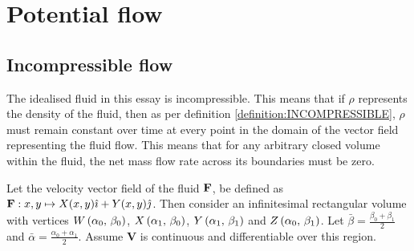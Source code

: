 \section{Potential flow}
\subsection{Incompressible flow}
The idealised fluid in this essay is incompressible. This means that if $\rho$ represents the density of the fluid, then as per definition \ref{definition:INCOMPRESSIBLE}, $\rho$ must 
remain constant over time at every point in the domain of the vector field representing the fluid flow. This means that for any arbitrary closed volume within the fluid, the net mass
flow rate across its boundaries must be zero.

Let the velocity vector field of the fluid $\mathbf{\mathbf{F}}$, be defined as $\mathbf{F}:x,y\mapsto X(x,y)\hat{\imath}+Y(x,y)\hat{\jmath}$. Then consider an infinitesimal rectangular volume with vertices
$W\left(\alpha_0,\,\beta_0\right)$, $X\left(\alpha_1,\,\beta_0\right)$, $Y\left(\alpha_1,\,\beta_1\right)$ and $Z\left(\alpha_0,\,\beta_1\right)$. Let $\bar{\beta}=\frac{\beta_0+\beta_1}{2}$ and $\bar{\alpha}=\frac{\alpha_0+\alpha_1}{2}$.
Assume $\mathbf{V}$ is continuous and differentiable over this region.

\begin{center}
\end{center}


